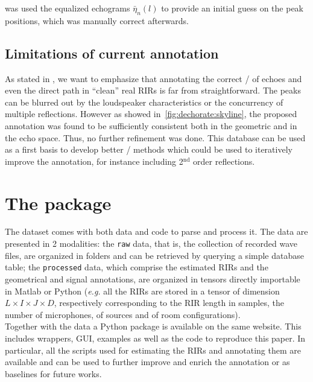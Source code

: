  was used the equalized echograms $\bar{\eta}_{n}(l)$ to provide an initial guess on the peak positions, which was manually correct afterwards.

\subsection{Limitations of current annotation}
As stated in , we want to emphasize that annotating the correct \TOAs/ of echoes and even the direct path in ``clean'' real \acp{RIR} is far from straightforward.
The peaks can be blurred out by the loudspeaker characteristics or the concurrency of multiple reflections.
However as showed in~\cref{fig:dechorate:skyline}, the proposed annotation was found to be sufficiently consistent both in the geometric and in the echo space.
Thus, no further refinement was done.
This database can be used as a first basis to develop better \AER/ methods which could be used to iteratively improve the annotation, for instance including  2$^\text{nd}$ order reflections.

\section{The  package}
The dataset comes with both data and code to parse and process it.
The data are presented in 2 modalities: the \texttt{raw} data, that is, the collection of recorded wave files, are organized in folders and can be retrieved by querying a simple database table; the \texttt{processed} data, which comprise the estimated \acp{RIR} and the geometrical and signal annotations, are organized in tensors directly importable in Matlab or Python (\textit{e.g.} all the \acp{RIR} are stored in a tensor of dimension $L \times I \times J \times D$, respectively corresponding to the RIR length in samples, the number of microphones, of sources and of room configurations).
\\Together with the data a Python package is available on the same website. This includes wrappers, GUI, examples as well as the code to reproduce this paper.
In particular, all the scripts used for estimating the \acp{RIR} and annotating them are available and can be used to further improve and enrich the annotation or as baselines for future works.


